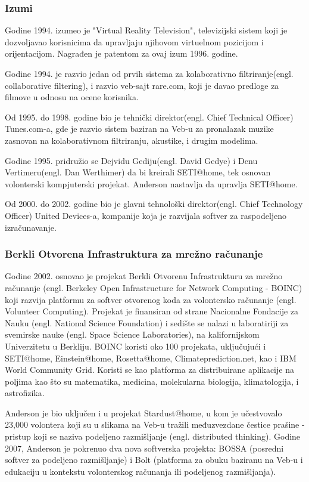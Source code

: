 \documentclass[titlepage, 12pt]{article}
\begin{document}
\subsubsection{Izumi}
Godine 1994. izumeo je "Virtual Reality Television", televizijski sistem koji je dozvoljavao korisnicima da upravljaju njihovom virtuelnom pozicijom i orijentacijom. Nagrađen je patentom za ovaj izum 1996. godine.

Godine 1994. je razvio jedan od prvih sistema za kolaborativno filtriranje(engl. collaborative filtering), i razvio veb-sajt rare.com, koji je davao predloge za filmove u odnosu na ocene korisnika.

Od 1995. do 1998. godine bio je tehnički direktor(engl. Chief Technical Officer) Tunes.com-a, gde je razvio sistem baziran na Veb-u za pronalazak muzike zasnovan na kolaborativnom filtriranju, akustike, i drugim modelima.

Godine 1995. pridružio se Dejvidu Gediju(engl. David Gedye) i Denu Vertimeru(engl. Dan Werthimer) da bi kreirali SETI@home, tek osnovan volonterski kompjuterski projekat. Anderson nastavlja da upravlja SETI@home.

Od 2000. do 2002. godine bio je glavni tehnološki direktor(engl. Chief Technology Officer) United Devices-a, kompanije koja je razvijala softver za raspodeljeno izračunavanje.

\subsubsection{Berkli Otvorena Infrastruktura za mrežno računanje}
Godine 2002. osnovao je projekat Berkli Otvorenu Infrastrukturu za mrežno računanje (engl. Berkeley Open Infrastructure for Network Computing - BOINC) koji razvija platformu za softver otvorenog koda za volontersko računanje (engl. Volunteer Computing). Projekat je finansiran od strane Nacionalne Fondacije za Nauku (engl. National Science Foundation) i sedište se nalazi u laboratiriji za svemirske nauke (engl. Space Science Laboratories), na kalifornijskom Univerzitetu u Berkliju. BOINC koristi oko 100 projekata, uključujući i SETI@home, Einstein@home, Rosetta@home, Climateprediction.net, kao i IBM World Community Grid. Koristi se kao platforma za distribuirane aplikacije na poljima kao što su matematika, medicina, molekularna biologija, klimatologija, i astrofizika.

Anderson je bio uključen i u projekat Stardust@home, u kom je učestvovalo 23,000 volontera koji su u slikama na Veb-u tražili međuzvezdane čestice prašine - pristup koji se naziva podeljeno razmišljanje (engl. distributed thinking). Godine 2007, Anderson je pokrenuo dva nova softverska projekta: BOSSA (posredni softver za podeljeno razmišljanje) i Bolt (platforma za obuku baziranu na Veb-u i edukaciju u kontekstu volonterskog računanja ili podeljenog razmišljanja).
\end{document}
